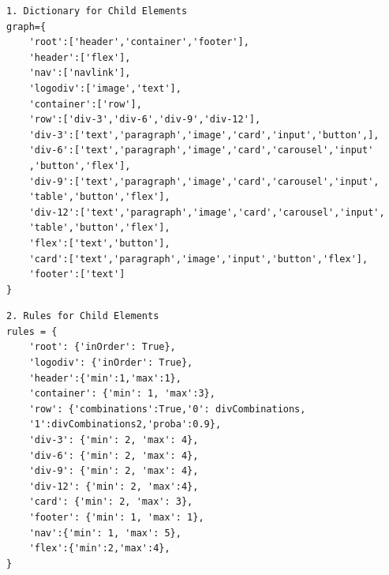 \documentclass{ioereport}
\begin{document}
\begin{verbatim}
1. Dictionary for Child Elements
graph={
    'root':['header','container','footer'],
    'header':['flex'],
    'nav':['navlink'],
    'logodiv':['image','text'],
    'container':['row'],
    'row':['div-3','div-6','div-9','div-12'],
    'div-3':['text','paragraph','image','card','input','button',],
    'div-6':['text','paragraph','image','card','carousel','input'
    ,'button','flex'],
    'div-9':['text','paragraph','image','card','carousel','input',
    'table','button','flex'],
    'div-12':['text','paragraph','image','card','carousel','input',
    'table','button','flex'],
    'flex':['text','button'],
    'card':['text','paragraph','image','input','button','flex'],
    'footer':['text']
}
\end{verbatim}
\begin{verbatim}
2. Rules for Child Elements
rules = {
    'root': {'inOrder': True},
    'logodiv': {'inOrder': True},
    'header':{'min':1,'max':1},
    'container': {'min': 1, 'max':3},
    'row': {'combinations':True,'0': divCombinations,
    '1':divCombinations2,'proba':0.9},
    'div-3': {'min': 2, 'max': 4},
    'div-6': {'min': 2, 'max': 4},
    'div-9': {'min': 2, 'max': 4},
    'div-12': {'min': 2, 'max':4},
    'card': {'min': 2, 'max': 3},
    'footer': {'min': 1, 'max': 1},
    'nav':{'min': 1, 'max': 5},
    'flex':{'min':2,'max':4},
}
\end{verbatim}
\end{document}
